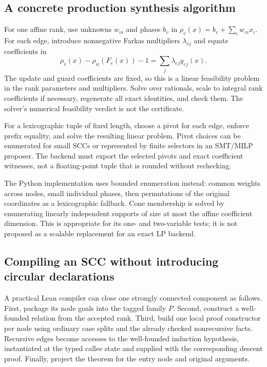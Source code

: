 \subsection{A concrete production synthesis algorithm}

For one affine rank, use unknowns $w_{vi}$ and phases $b_v$ in
$\rho_v(x)=b_v+\sum_i w_{vi}x_i$. For each edge, introduce nonnegative Farkas
multipliers $\lambda_{ej}$ and equate coefficients in
\[
 \rho_v(x)-\rho_w(F_e(x))-1=\sum_j\lambda_{ej}g_{ej}(x).
\]
The update and guard coefficients are fixed, so this is a linear feasibility
problem in the rank parameters and multipliers. Solve over rationals, scale to
integral rank coefficients if necessary, regenerate all exact identities, and
check them. The solver's numerical feasibility verdict is not the certificate.

For a lexicographic tuple of fixed length, choose a pivot for each edge, enforce
prefix equality, and solve the resulting linear problem. Pivot choices can be
enumerated for small SCCs or represented by finite selectors in an SMT/MILP
proposer. The backend must export the selected pivots and exact coefficient
witnesses, not a floating-point tuple that is rounded without rechecking.

The Python implementation uses bounded enumeration instead: common weights
across nodes, small individual phases, then permutations of the original
coordinates as a lexicographic fallback. Cone membership is solved by enumerating
linearly independent supports of size at most the affine coefficient dimension.
This is appropriate for its one- and two-variable tests; it is not proposed as
a scalable replacement for an exact LP backend.

\subsection{Compiling an SCC without introducing circular declarations}

A practical Lean compiler can close one strongly connected component as follows.
First, package its node goals into the tagged family $P$. Second, construct a
well-founded relation from the accepted rank. Third, build one local proof
constructor per node using ordinary case splits and the already checked
nonrecursive facts. Recursive edges become accesses to the well-founded
induction hypothesis, instantiated at the typed callee state and supplied with
the corresponding descent proof. Finally, project the theorem for the entry
node and original arguments.

